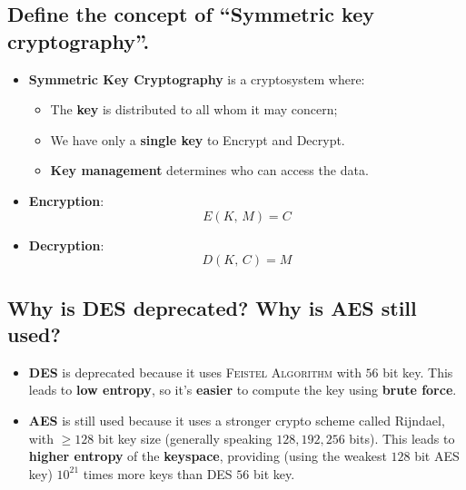 \documentclass[9pt, letterpaper]{article}
\begin{document}
\subsection{Define the concept of “Symmetric key cryptography”.}
\begin{itemize}
	\item \textbf{Symmetric Key Cryptography} is a cryptosystem where:
	\begin{itemize}
		\item The \textbf{key} is distributed to all whom it may concern;
		\item We have only a \textbf{single key} to Encrypt and Decrypt.
		\item \textbf{Key management} determines who can access the data.
	\end{itemize}
	\item \textbf{Encryption}: $$E(K \mbox{, }M) = C$$
	\item \textbf{Decryption}: $$D(K \mbox{, }C) = M$$
\end{itemize}


\subsection{Why is DES deprecated? Why is AES still used?}
\begin{itemize}
	\item \textbf{DES} is deprecated because it uses \textsc{Feistel Algorithm} with $56$ bit key. This leads to \textbf{low entropy}, so it's \textbf{easier} to compute the key using \textbf{brute force}.
	\item \textbf{AES} is still used because it uses a stronger crypto scheme called Rijndael, with $\ge 128$ bit key size (generally speaking $128,192,256$ bits). This leads to \textbf{higher entropy} of the \textbf{keyspace}, providing (using the weakest $128$ bit AES key) $10^{21}$ times more keys than DES $56$ bit key.
\end{itemize}
\end{document}
